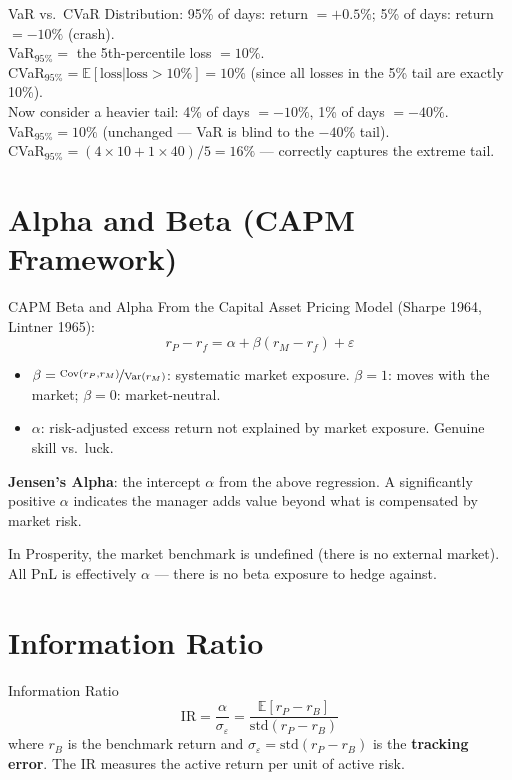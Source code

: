 \documentclass[12pt,a4paper,openany]{report}
\theoremstyle{definition}
\newcommand{\E}{\mathbb{E}}
\newcommand{\Var}{\operatorname{Var}}
\newcommand{\Cov}{\operatorname{Cov}}
\begin{document}
\begin{examplebox}{VaR vs.\ CVaR}
Distribution: 95\% of days: return $= +0.5\%$; 5\% of days: return $= -10\%$ (crash). \\
VaR$_{95\%} = $ the 5th-percentile loss $= 10\%$. \\
CVaR$_{95\%} = \E[\text{loss} | \text{loss} > 10\%] = 10\%$ (since all losses in the 5\% tail are exactly 10\%). \\
Now consider a heavier tail: 4\% of days $= -10\%$, 1\% of days $= -40\%$. \\
VaR$_{95\%} = 10\%$ (unchanged — VaR is blind to the $-40\%$ tail). \\
CVaR$_{95\%} = (4 \times 10 + 1 \times 40)/5 = 16\%$ — correctly captures the extreme tail.
\end{examplebox}

\section{Alpha and Beta (CAPM Framework)}

\begin{definitionbox}{CAPM Beta and Alpha}
From the Capital Asset Pricing Model (Sharpe 1964, Lintner 1965):
\[
  r_P - r_f = \alpha + \beta(r_M - r_f) + \varepsilon
\]
\begin{itemize}
  \item $\beta = \nicefrac{\Cov(r_P, r_M)}{\Var(r_M)}$: systematic market exposure. $\beta = 1$: moves with the market; $\beta = 0$: market-neutral.
  \item $\alpha$: risk-adjusted excess return not explained by market exposure. Genuine skill vs.\ luck.
\end{itemize}
\end{definitionbox}

\textbf{Jensen's Alpha}: the intercept $\alpha$ from the above regression. A significantly positive $\alpha$ indicates the manager adds value beyond what is compensated by market risk.

In Prosperity, the market benchmark is undefined (there is no external market). All PnL is effectively $\alpha$ — there is no beta exposure to hedge against.

\section{Information Ratio}

\begin{definitionbox}{Information Ratio}
\[
  \text{IR} = \frac{\alpha}{\sigma_\varepsilon} = \frac{\E[r_P - r_B]}{\text{std}(r_P - r_B)}
\]
where $r_B$ is the benchmark return and $\sigma_\varepsilon = \text{std}(r_P - r_B)$ is the \textbf{tracking error}. The IR measures the active return per unit of active risk.
\end{definitionbox}
\end{document}
